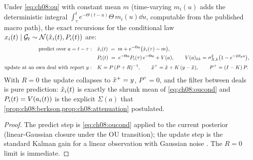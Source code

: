 \begin{lemma}\label{lem:ch08:ou}
Under \cref{eq:ch08:ou} with constant mean $m$ (time-varying $m_i(u)$
adds the deterministic integral $\int_\tau^t e^{-\Theta(t-u)}\Theta\,
m_i(u)\dd u$, computable from the published macro path), the exact
recursions for the conditional law $x_i(t) \mid \mathcal{G}_t \sim
\mathcal{N}(\hat{x}_i(t), P_i(t))$ are:
\begin{align}
\text{predict over } a = t - \tau:\quad
&\hat{x}_i(t) \;=\; m + e^{-\Theta a}\big(\hat{x}_i(\tau) - m\big),
\nonumber\\
&P_i(t) \;=\; e^{-\Theta a} P_i(\tau)\, e^{-\Theta a}
 + V(a), \qquad
 V(a)_{kk} = \sigma^2_{X,k}\big(1 - e^{-2\vartheta_k a}\big),
\label{eq:ch08:kalmanpredict}\\[2pt]
\text{update at an own deal with report } y:\quad
&K = P\,(P + R)^{-1}, \qquad
\hat{x}^{+} = \hat{x} + K\,(y - \hat{x}), \qquad
P^{+} = (I - K)\,P.
\label{eq:ch08:kalmanupdate}
\end{align}
With $R = 0$ the update collapses to $\hat{x}^+ = y$, $P^+ = 0$, and
the filter between deals is pure prediction: $\hat{x}_i(t)$ is exactly
the shrunk mean of \cref{eq:ch08:oucond} and $P_i(t) = V(a_i(t))$
is the explicit $\Sigma(a)$ that
\cref{prop:ch08:berkson,prop:ch08:attenuation} postulated.
\end{lemma}

\begin{proof}
The predict step is \cref{eq:ch08:oucond} applied to the current
posterior (linear-Gaussian closure under the OU transition); the update
step is the standard Kalman gain for a linear observation with Gaussian
noise \citep{kalman1960,harvey1989}. The $R=0$ limit is immediate.
\end{proof}

